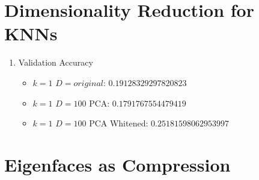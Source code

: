 \documentclass[12pt]{article}
\begin{document}
\begin{enumerate}
\begin{figure}[H]
\begin{center}
        \label{GD}
        \end{center}
    \end{figure}
\end{enumerate}

\section{Dimensionality Reduction for KNNs}\label{knn}

\begin{enumerate}
    \item Validation Accuracy
    \begin{itemize}
        \item $k=1$ $D=original$: $0.19128329297820823$
        \item $k=1$ $D=100$ PCA: $0.1791767554479419$
        \item $k=1$ $D=100$ PCA Whitened: $0.25181598062953997$
    \end{itemize}
\end{enumerate}

\section{Eigenfaces as Compression}\label{eigenface}
\end{document}
